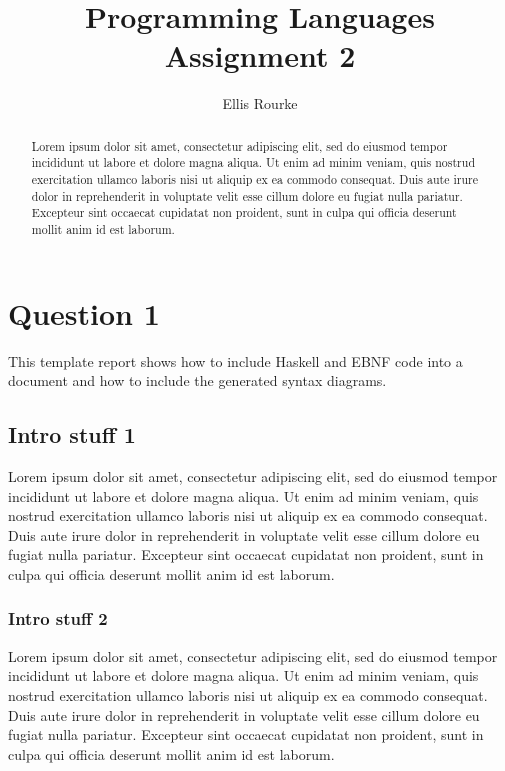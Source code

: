 \documentclass[a4paper]{article}
\begin{document}
\title{Programming Languages Assignment 2}

\author{Ellis Rourke}

\maketitle

\begin{abstract}
   Lorem ipsum dolor sit amet, consectetur adipiscing elit, sed do eiusmod
   tempor incididunt ut labore et dolore magna aliqua. Ut enim ad minim
   veniam, quis nostrud exercitation ullamco laboris nisi ut aliquip ex ea
   commodo consequat. Duis aute irure dolor in reprehenderit in voluptate
   velit esse cillum dolore eu fugiat nulla pariatur. Excepteur sint occaecat
   cupidatat non proident, sunt in culpa qui officia deserunt mollit anim id
   est laborum.
\end{abstract}

\section{Question 1}

This template report shows how to include Haskell and EBNF code into a document
and how to include the generated syntax diagrams. 



\subsection{Intro stuff 1}

Lorem ipsum dolor sit amet, consectetur adipiscing elit, sed do eiusmod
tempor incididunt ut labore et dolore magna aliqua. Ut enim ad minim
veniam, quis nostrud exercitation ullamco laboris nisi ut aliquip ex ea
commodo consequat. Duis aute irure dolor in reprehenderit in voluptate
velit esse cillum dolore eu fugiat nulla pariatur. Excepteur sint occaecat
cupidatat non proident, sunt in culpa qui officia deserunt mollit anim id
est laborum.

\subsubsection{Intro stuff 2}

Lorem ipsum dolor sit amet, consectetur adipiscing elit, sed do eiusmod
tempor incididunt ut labore et dolore magna aliqua. Ut enim ad minim
veniam, quis nostrud exercitation ullamco laboris nisi ut aliquip ex ea
commodo consequat. Duis aute irure dolor in reprehenderit in voluptate
velit esse cillum dolore eu fugiat nulla pariatur. Excepteur sint occaecat
cupidatat non proident, sunt in culpa qui officia deserunt mollit anim id
est laborum.
\end{document}
